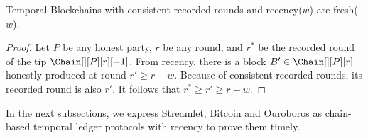 \begin{theorem}\label{thm.recency-to-freshness}
  Temporal Blockchains with consistent recorded rounds and recency($w$) are fresh($w$).
\end{theorem}
\begin{proof}
  Let $P$ be any honest party, $r$ be any round, and
  $r^*$ be the recorded round of the tip $\Chain[][P][r][-1]$.
  From recency, there is a block $B' \in \Chain[][P][r]$
  honestly produced at round $r' \geq r - w$.
  Because of consistent recorded rounds, its recorded round is also $r'$.
  It follows that $r^* \geq r' \geq r - w$.
  \Qed
\end{proof}

In the next subsections, we express Streamlet, Bitcoin and Ouroboros
as chain-based temporal ledger protocols with recency to
prove them timely.
